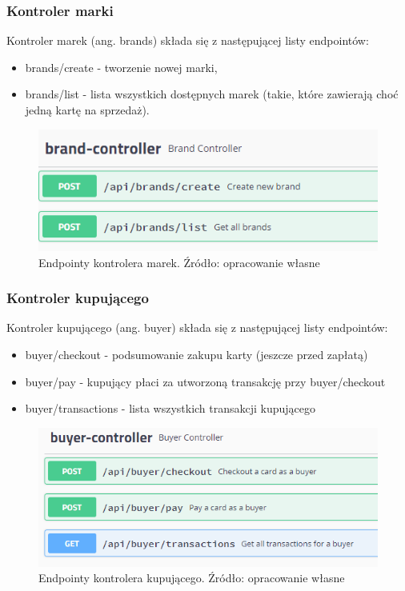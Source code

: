 \subsubsection{Kontroler marki}
Kontroler marek (ang. brands) składa się z następującej listy endpointów:
\begin{itemize}
    \item brands/create - tworzenie nowej marki,
    \item brands/list - lista wszystkich dostępnych marek (takie, które zawierają choć jedną kartę na sprzedaż).
\end{itemize}
\begin{figure}[h!]
  \centering
    \includegraphics[width=1.0\textwidth]{images/brand-controller.PNG}
  \caption{Endpointy kontrolera marek. Źródło: opracowanie własne }
\end{figure}
\FloatBarrier

\subsubsection{Kontroler kupującego}
Kontroler kupującego (ang. buyer) składa się z następującej listy endpointów:
\begin{itemize}
    \item buyer/checkout - podsumowanie zakupu karty (jeszcze przed zapłatą)
    \item buyer/pay - kupujący płaci za utworzoną transakcję przy buyer/checkout
    \item buyer/transactions - lista wszystkich transakcji kupującego
\end{itemize}
\begin{figure}[h!]
  \centering
    \includegraphics[width=1.0\textwidth]{images/buyer-controller.PNG}
  \caption{Endpointy kontrolera kupującego. Źródło: opracowanie własne }
\end{figure}
\FloatBarrier

